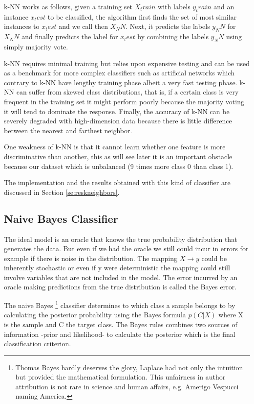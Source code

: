 \documentclass[11pt]{article}
\theoremstyle{definition}
\theoremstyle{remark}
\begin{document}
k-NN works as follows, given a training set $X_train$ with labels $y_train$ and an instance $x_test$ to be classified, the algorithm first  finds the set of most similar instances to $x_test$ and we call then $X_NN$. Next, it predicts the labels $y_NN$ for $X_NN$ and finally predicts the label for $x_test$ by combining the labels $y_NN$ using simply majority vote. 

k-NN requires minimal training but relies upon expensive testing and can be used as a benchmark for more complex classifiers such as artificial networks which contrary to k-NN  have lengthy training phase albeit a very fast testing phase. k-NN can suffer from skewed class distributions, that is, if a certain class is very frequent in the training set it might perform poorly because the majority voting it will tend to dominate the response. Finally, the accuracy of k-NN can be severely degraded with high-dimension data because there is little difference between the nearest and farthest neighbor.

One weakness of k-NN  is that it cannot learn whether one feature is more discriminative than another, this as will see later it is an important obstacle because our dataset which is unbalanced (9 times more class 0 than class 1).

The implementation and the results obtained with this kind of classifier are discussed in Section \ref{se:reskneighbors}.

\subsection{Naive Bayes Classifier}
\label{sse:naivebayes}

The ideal model is an oracle that knows the true probability distribution that generates the data. But even if we had the oracle we still could incur in errors for example if there is noise in the distribution.
The mapping $X \to y$ could be inherently stochastic or even if y were deterministic the mapping could still involve variables that are not included in the model. The error incurred by an oracle making predictions from the true distribution is called the Bayes error.

The naive Bayes \footnote{Thomas Bayes hardly deserves the glory, Laplace had not only the intuition but provided the mathematical formulation. This unfairness in author attribution is not rare in science and human affairs, e.g. Amerigo Vespucci naming America.} classifier determines to which class a sample belongs to by calculating the posterior probability using the Bayes formula $p(C|X)$ where X is the sample and C the target class.
The Bayes rules combines two sources of information -prior and likelihood- to calculate the posterior which is the final classification criterion. 
\end{document}
